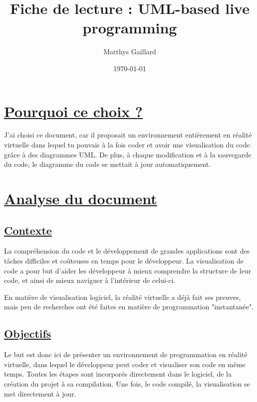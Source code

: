 \documentclass[a4paper,10pt, oneside]{article}
\title{Fiche de lecture : UML-based live programming}
\author{Matthys Gaillard}
\date{\today}
\newcommand{\li}{\newline}
\begin{document}
\maketitle
\section{\ul{Pourquoi ce choix ?}}
    \par J'ai choisi ce document\cite{A1}, car il proposait un environnement entièrement en réalité virtuelle dans lequel tu pouvais à la fois coder et avoir une visualisation
    du code grâce à des diagrammes UML. De plus, à chaque modification et à la sauvegarde du code, le diagramme du code se mettait à jour automatiquement.
\section{\ul{Analyse du document}}
\subsection{\ul{Contexte}}
    \par La compréhension du code et le développement de grandes applications sont des tâches difficiles et coûteuses en temps pour le développeur.
    La visualisation de code a pour but d'aider les développeur à mieux comprendre la structure de leur code, et ainsi de mieux naviguer à l'intérieur de celui-ci.\li
    \par En matière de visualisation logiciel, la réalité virtuelle a déjà fait ses preuves, mais peu de recherches ont été faites en matière de programmation "instantanée".
\subsection{\ul{Objectifs}}
    \par Le but est donc ici de présenter un environnement de programmation en réalité virtuelle, dans lequel le développeur peut coder et visualiser son code en même temps.
    Toutes les étapes sont incorporés directement dans le logiciel, de la création du projet à sa compilation. Une fois, le code compilé, la visualisation se met directement à jour.               
\end{document}
